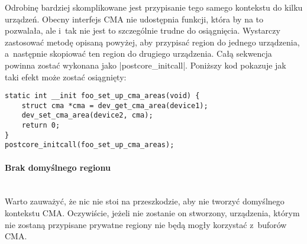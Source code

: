 Odrobinę bardziej skomplikowane jest przypisanie tego samego kontekstu
do kilku urządzeń.  Obecny interfejs CMA nie udostępnia funkcji, która
by na to pozwalała, ale i~tak nie jest to szczególnie trudne do
osiągnięcia.  Wystarczy zastosować metodę opisaną powyżej, aby
przypisać region do jednego urządzenia, a~następnie skopiować ten
region do drugiego urządzenia.  Całą sekwencja powinna zostać wykonana
jako \code|postcore_initcall|.  Poniższy kod pokazuje jak taki
efekt może zostać osiągnięty:

\begin{lstlisting}
static int __init foo_set_up_cma_areas(void) {
	struct cma *cma = dev_get_cma_area(device1);
	dev_set_cma_area(device2, cma);
	return 0;
}
postcore_initcall(foo_set_up_cma_areas);
\end{lstlisting}

\paragraph{Brak domyślnego regionu} \hspace{0pt} \\

Warto zauważyć, że nic nie stoi na przeszkodzie, aby nie tworzyć
domyślnego kontekstu CMA.  Oczywiście, jeżeli nie zostanie on
stworzony, urządzenia, którym nie zostaną przypisane prywatne regiony
nie będą mogły korzystać z~buforów CMA.
